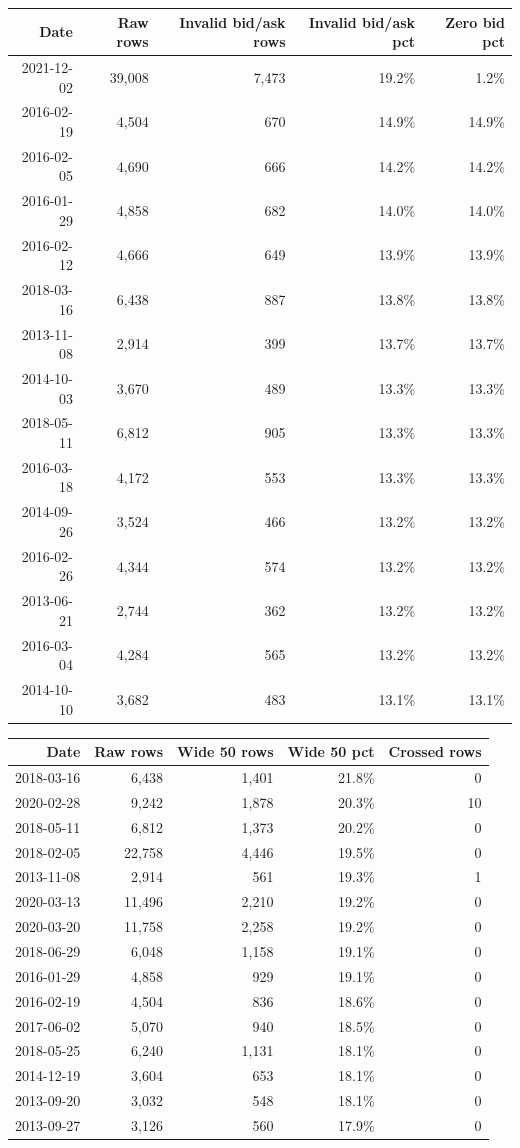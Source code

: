 \documentclass[11pt]{article}
\begin{document}
\begingroup
\scriptsize
\begin{longtable}{rrrrr}
\toprule
Date & Raw rows & Invalid bid/ask rows & Invalid bid/ask pct & Zero bid pct \\
\midrule
2021-12-02 & 39,008 & 7,473 & 19.2\% & 1.2\% \\
2016-02-19 & 4,504 & 670 & 14.9\% & 14.9\% \\
2016-02-05 & 4,690 & 666 & 14.2\% & 14.2\% \\
2016-01-29 & 4,858 & 682 & 14.0\% & 14.0\% \\
2016-02-12 & 4,666 & 649 & 13.9\% & 13.9\% \\
2018-03-16 & 6,438 & 887 & 13.8\% & 13.8\% \\
2013-11-08 & 2,914 & 399 & 13.7\% & 13.7\% \\
2014-10-03 & 3,670 & 489 & 13.3\% & 13.3\% \\
2018-05-11 & 6,812 & 905 & 13.3\% & 13.3\% \\
2016-03-18 & 4,172 & 553 & 13.3\% & 13.3\% \\
2014-09-26 & 3,524 & 466 & 13.2\% & 13.2\% \\
2016-02-26 & 4,344 & 574 & 13.2\% & 13.2\% \\
2013-06-21 & 2,744 & 362 & 13.2\% & 13.2\% \\
2016-03-04 & 4,284 & 565 & 13.2\% & 13.2\% \\
2014-10-10 & 3,682 & 483 & 13.1\% & 13.1\% \\
\bottomrule
\end{longtable}
\endgroup

\begingroup
\scriptsize
\begin{longtable}{rrrrr}
\toprule
Date & Raw rows & Wide 50 rows & Wide 50 pct & Crossed rows \\
\midrule
2018-03-16 & 6,438 & 1,401 & 21.8\% & 0 \\
2020-02-28 & 9,242 & 1,878 & 20.3\% & 10 \\
2018-05-11 & 6,812 & 1,373 & 20.2\% & 0 \\
2018-02-05 & 22,758 & 4,446 & 19.5\% & 0 \\
2013-11-08 & 2,914 & 561 & 19.3\% & 1 \\
2020-03-13 & 11,496 & 2,210 & 19.2\% & 0 \\
2020-03-20 & 11,758 & 2,258 & 19.2\% & 0 \\
2018-06-29 & 6,048 & 1,158 & 19.1\% & 0 \\
2016-01-29 & 4,858 & 929 & 19.1\% & 0 \\
2016-02-19 & 4,504 & 836 & 18.6\% & 0 \\
2017-06-02 & 5,070 & 940 & 18.5\% & 0 \\
2018-05-25 & 6,240 & 1,131 & 18.1\% & 0 \\
2014-12-19 & 3,604 & 653 & 18.1\% & 0 \\
2013-09-20 & 3,032 & 548 & 18.1\% & 0 \\
2013-09-27 & 3,126 & 560 & 17.9\% & 0 \\
\bottomrule
\end{longtable}
\endgroup
\end{document}
